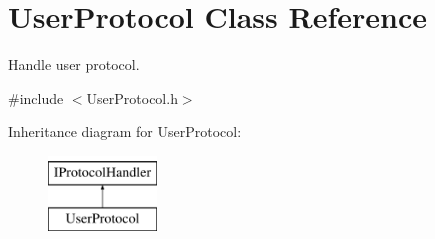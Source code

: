 \hypertarget{class_user_protocol}{\section{User\-Protocol Class Reference}
\label{class_user_protocol}
}


Handle user protocol.  




{\ttfamily \#include $<$User\-Protocol.\-h$>$}

Inheritance diagram for User\-Protocol\-:\begin{figure}[H]
\begin{center}
\leavevmode
\includegraphics[height=2.000000cm]{class_user_protocol}
\end{center}
\end{figure}
